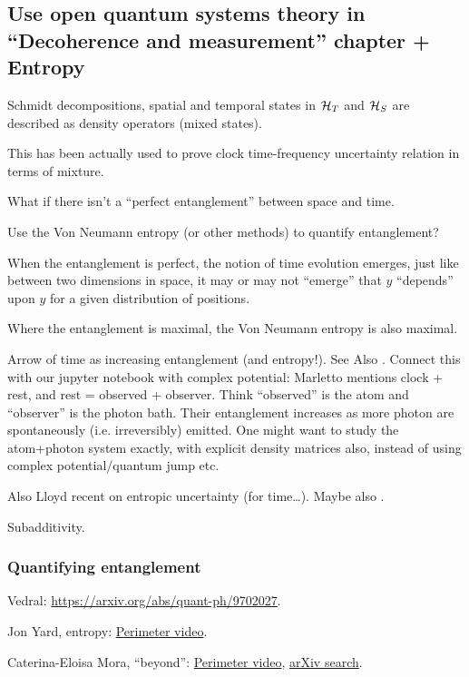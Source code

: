 \subsection{Use open quantum systems theory in ``Decoherence and measurement'' chapter + Entropy}
Schmidt decompositions, spatial and temporal states in
$\mathcal{H}_T$ and $\mathcal{H}_S$
are described as density operators
(mixed states).

This has been actually used to prove clock time-frequency uncertainty relation
in terms of mixture.

What if there isn't a ``perfect entanglement'' between space and time.

Use the Von Neumann entropy (or other methods) to quantify entanglement?

When the entanglement is perfect, the notion of time evolution emerges, just
like between two dimensions in space, it may or may not ``emerge'' that
$y$ ``depends'' upon $y$ for a given distribution of positions.

Where the entanglement is maximal, the Von Neumann entropy is also maximal.

Arrow of time as increasing entanglement (and entropy!). See Also
\cite{Marletto:Evolution}.
Connect this with our jupyter notebook with complex potential: Marletto mentions
clock + rest, and rest = observed + observer. Think ``observed'' is the atom
and ``observer'' is the photon bath. Their entanglement increases as
more photon are spontaneously (i.e. irreversibly) emitted.
One might want to study the atom+photon system exactly,
with explicit density matrices also,
instead of using
complex potential/quantum jump etc.

Also Lloyd recent on entropic uncertainty (for time\dots \cite{Lloyd:Entropic}).
Maybe also \cite{Wehner:Uncertainty}.

Subadditivity.

\subsubsection{Quantifying entanglement}

Vedral: \url{https://arxiv.org/abs/quant-ph/9702027}.

Jon Yard, entropy: \href{http://www.perimeterinstitute.ca/fr/videos/quantifying-entanglement-quantum-entropy}{Perimeter video}.

Caterina-Eloisa Mora, ``beyond'':
\href{https://www.perimeterinstitute.ca/videos/quantifying-quantumness-correlations-beyond-entanglement-and-back}{Perimeter video},
\href{https://arxiv.org/search/advanced?advanced=&terms-0-operator=AND&terms-0-term=Mora%2C+caterina-eloisa&terms-0-field=author&terms-1-operator=OR&terms-1-term=mora%2C+c+e&terms-1-field=author&classification-physics_archives=all&classification-include_cross_list=include&date-filter_by=all_dates&date-year=&date-from_date=&date-to_date=&date-date_type=submitted_date&abstracts=show&size=50&order=-announced_date_first}{arXiv search}.

